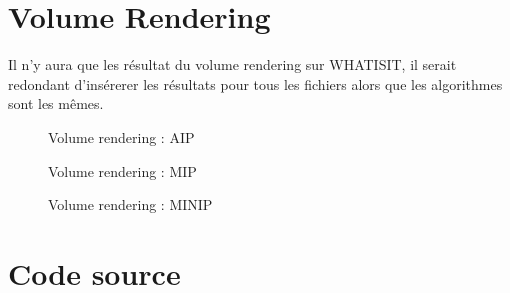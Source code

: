\documentclass [a4 paper,11pt]{report}
\begin{document}
\section*{Volume Rendering}
Il n'y aura que les résultat du volume rendering sur WHATISIT, il serait redondant d'insérerer les résultats pour tous les fichiers alors que les algorithmes sont les mêmes.

\begin{figure}[h!]
\noindent{}
\caption{Volume rendering : AIP}
\end{figure}

\begin{figure}[h!]
\noindent{}
\caption{Volume rendering : MIP}
\end{figure}

\begin{figure}[h!]
\noindent{}
\caption{Volume rendering : MINIP}
\end{figure}

\newpage
\section*{Code source}


\end{document}
